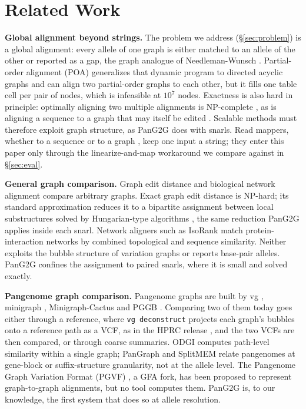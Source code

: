 \section{Related Work}
\textbf{Global alignment beyond strings.} The problem we address (\S\ref{sec:problem}) is a global alignment: every allele of one graph is either matched to an allele of the other or reported as a gap, the graph analogue of Needleman-Wunsch \cite{NEEDLEMAN1970443}. Partial-order alignment (POA) \cite{lee2002poa} generalizes that dynamic program to directed acyclic graphs and can align two partial-order graphs to each other, but it fills one table cell per pair of nodes, which is infeasible at $10^7$ nodes. Exactness is also hard in principle: optimally aligning two multiple alignments is NP-complete \cite{kececioglu2004aligning}, as is aligning a sequence to a graph that may itself be edited \cite{jain2020complexity}. Scalable methods must therefore exploit graph structure, as PanG2G does with snarls. Read mappers, whether to a sequence \cite{li2018minimap2} or to a graph \cite{garrison2018vg,xu2025parsga}, keep one input a string; they enter this paper only through the linearize-and-map workaround we compare against in \S\ref{sec:eval}.

\textbf{General graph comparison.} Graph edit distance and biological network alignment compare arbitrary graphs. Exact graph edit distance is NP-hard; its standard approximation reduces it to a bipartite assignment between local substructures solved by Hungarian-type algorithms \cite{riesen2009approximate}, the same reduction PanG2G applies inside each snarl. Network aligners such as IsoRank \cite{singh2008isorank} match protein-interaction networks by combined topological and sequence similarity. Neither exploits the bubble structure of variation graphs or reports base-pair alleles. PanG2G confines the assignment to paired snarls, where it is small and solved exactly.

\textbf{Pangenome graph comparison.} Pangenome graphs are built by vg \cite{garrison2018vg}, minigraph \cite{li2020minigraph}, Minigraph-Cactus \cite{hickey2023pangenome} and PGGB \cite{garrison2023pangenome}. Comparing two of them today goes either through a reference, where \texttt{vg deconstruct} projects each graph's bubbles onto a reference path as a VCF, as in the HPRC release \cite{Liao2023-short}, and the two VCFs are then compared, or through coarse summaries. ODGI \cite{guarracino2022odgi} computes path-level similarity within a single graph; PanGraph \cite{noll2023pangraph} and SplitMEM \cite{marcus2014splitmem} relate pangenomes at gene-block or suffix-structure granularity, not at the allele level. The Pangenome Graph Variation Format (PGVF) \cite{pgvfspec}, a GFA fork, has been proposed to represent graph-to-graph alignments, but no tool computes them. PanG2G is, to our knowledge, the first system that does so at allele resolution.
